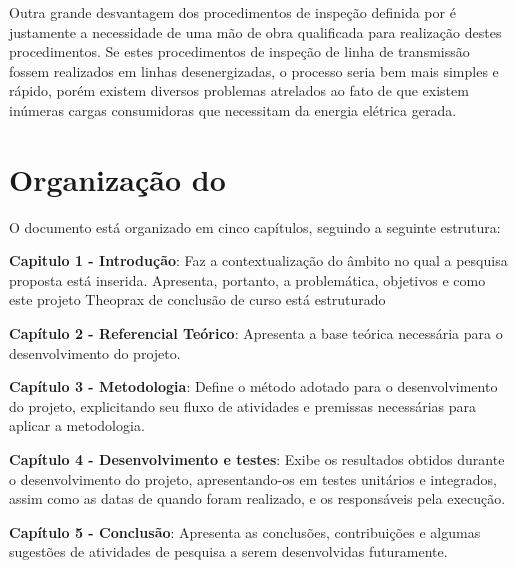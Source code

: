  Outra grande desvantagem dos procedimentos de inspeção definida por \cite{cinematicajuliana} é justamente a necessidade de uma mão de obra qualificada para realização destes procedimentos. Se estes procedimentos de inspeção de linha de transmissão fossem realizados em linhas desenergizadas, o processo seria bem mais simples e rápido, porém existem diversos problemas atrelados ao fato de que existem inúmeras cargas consumidoras que necessitam da energia elétrica gerada.


\section{Organização do \thetypework}
\label{section:organizacao}
O documento está organizado em cinco capítulos, seguindo a seguinte estrutura:

\textbf{Capitulo 1 - Introdução}: Faz a contextualização do âmbito no qual a pesquisa proposta
está inserida. Apresenta, portanto, a problemática, objetivos e como este projeto Theoprax de conclusão de curso está estruturado


\textbf{Capítulo 2 - Referencial Teórico}: Apresenta a base teórica necessária para o desenvolvimento do projeto.

\textbf{Capítulo 3 - Metodologia}: Define o método adotado para o desenvolvimento do projeto, explicitando seu fluxo de atividades e premissas necessárias para aplicar a metodologia.

\textbf{Capítulo 4 - Desenvolvimento e testes}: Exibe os resultados obtidos durante o desenvolvimento do
projeto, apresentando-os em testes unitários e integrados, assim como as datas de quando foram realizado, e os responsáveis pela execução.

\textbf{Capítulo 5 - Conclusão}: Apresenta as conclusões, contribuições e algumas sugestões de atividades de pesquisa a serem desenvolvidas futuramente.

